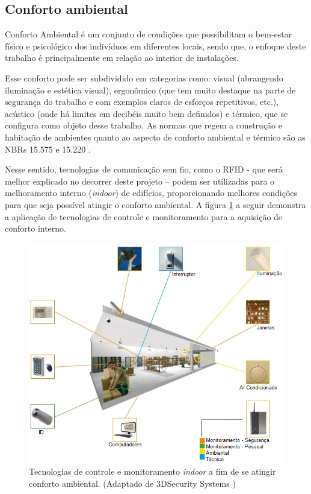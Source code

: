 \subsection{Conforto ambiental}

Conforto Ambiental é um conjunto de condições que possibilitam o bem-estar físico e psicológico dos indivíduos em diferentes locais, sendo que, o enfoque deste trabalho é principalmente em relação ao interior de instalações.

Esse conforto pode ser subdividido em categorias como: visual (abrangendo iluminação e estética visual), ergonômico (que tem muito destaque na parte de segurança do trabalho e com exemplos claros de esforços repetitivos, etc.), acústico (onde há limites em decibéis muito bem definidos) e térmico, que se configura como objeto desse trabalho. As normas que regem a construção e habitação de ambientes quanto ao aspecto de conforto ambiental e térmico são as NBRs 15.575 \cite{NBR15575} e 15.220 \cite{NBR15220}.

Nesse sentido, tecnologias de comunicação sem fio, como o RFID - que será melhor explicado no decorrer deste projeto – podem ser utilizadas para o melhoramento interno (\textit{indoor}) de edifícios, proporcionando melhores condições para que seja possível atingir o conforto ambiental. A figura \ref{fig:image} a seguir demonstra a aplicação de tecnologias de controle e monitoramento para a aquisição de conforto interno.

\begin{figure}[H]
    \centering
    \includegraphics[width=0.6\linewidth]{figs/Introducao/imagem.png}
    \caption{Tecnologias de controle e monitoramento \textit{indoor} a fim de se atingir conforto ambiental. (Adaptado de 3DSecurity Systems \cite{imagem})}
    \label{fig:image}
\end{figure}


